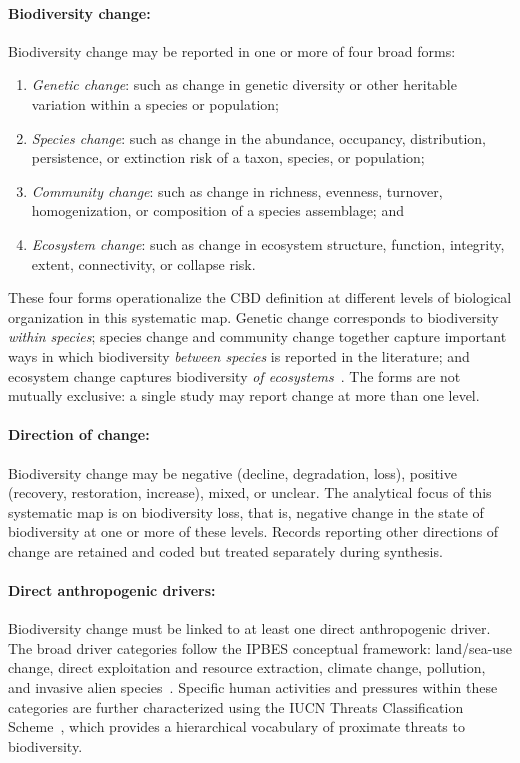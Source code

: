 \documentclass[12pt]{article}
\begin{document}
\paragraph*{Biodiversity change:}
Biodiversity change may be reported in one or more of four broad forms:
\begin{enumerate}
    \item \emph{Genetic change}: such as change in genetic diversity or 
    other heritable variation within a species or population;
    \item \emph{Species change}: such as change in the abundance, 
    occupancy, distribution, persistence, or extinction risk of a taxon, 
    species, or population;
    \item \emph{Community change}: such as change in richness, evenness, 
    turnover, homogenization, or composition of a species assemblage; and
    \item \emph{Ecosystem change}: such as change in ecosystem structure, 
    function, integrity, extent, connectivity, or collapse risk.
\end{enumerate}

These four forms operationalize the CBD definition at different levels of biological organization in this systematic map. Genetic change corresponds to biodiversity \emph{within species}; species change and community change together capture important ways in which biodiversity \emph{between species} is reported in the literature; and ecosystem change captures biodiversity \emph{of ecosystems}~\cite{CBD1992}. The forms are not mutually exclusive: a single study may report change at more than one level.

\paragraph*{Direction of change:}
Biodiversity change may be negative (decline, degradation, loss), positive (recovery, restoration, increase), mixed, or unclear. The analytical focus of this systematic map is on biodiversity loss, that is, negative change in the state of biodiversity at one or more of these levels. Records reporting other directions of change are retained and coded but treated separately during synthesis.

\paragraph*{Direct anthropogenic drivers:}
Biodiversity change must be linked to at least one direct anthropogenic driver. The broad driver categories follow the IPBES conceptual framework: land/sea-use change, direct exploitation and resource extraction, climate change, pollution, and invasive alien species~\cite{diaz_ipbes_2015}. Specific human activities and pressures within these categories are further characterized using the IUCN Threats Classification Scheme~\cite{iucn_threats_classification_2022}, which provides a hierarchical vocabulary of proximate threats to biodiversity.
\end{document}
